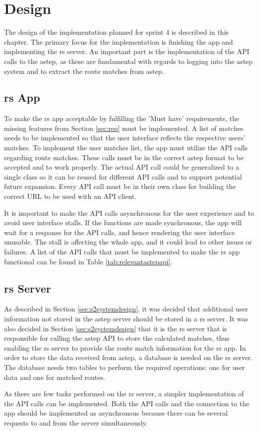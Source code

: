 \section{Design}
The design of the implementation planned for sprint 4 is described in this chapter.
The primary focus for the implementation is finishing the app and implementing the \gls{rs} server.
An important part is the implementation of the API calls to the \gls{astep}, as these are fundamental with regards to logging into the \gls{astep} system and to extract the route matches from \gls{astep}.

\subsection{\gls{rs} App}
To make the \gls{rs} app acceptable by fulfilling the 'Must have' requirements, the missing features from Section \ref{sec:req} must be implemented.
A list of matches needs to be implemented so that the user interface reflects the respective users' matches.
To implement the user matches list, the app must utilize the API calls regarding route matches.
These calls must be in the correct \gls{astep} format to be accepted and to work properly.
The actual API call could be generalized to a single class so it can be reused for different API calls and to support potential future expansion.
Every API call must be in their own class for building the correct URL to be used with an API client.

It is important to make the API calls asynchronous for the user experience and to avoid user interface stalls. 
If the functions are made synchronous, the app will wait for a response for the API calls, and hence rendering the user interface unusable.
The stall is affecting the whole app, and it could lead to other issues or failures.
A list of the API calls that must be implemented to make the \gls{rs} app functional can be found in Table \ref{tab:relevantastepapi}.

\subsection{\gls{rs} Server}
As described in Section \ref{sec:s2systemdesign}, it was decided that additional user information not stored in the \gls{astep} server should be stored in a \gls{rs} server.
It was also decided in Section \ref{sec:s2systemdesign} that it is the \gls{rs} server that is responsible for calling the \gls{astep} API to store the calculated matches, thus enabling the \gls{rs} server to provide the route match information for the \gls{rs} app.
In order to store the data received from \gls{astep}, a database is needed on the \gls{rs} server.
The database needs two tables to perform the required operations: one for user data and one for matched routes.

As there are few tasks performed on the \gls{rs} server, a simpler implementation of the API calls can be implemented.
Both the API calls and the connection to the app should be implemented as asynchronous because there can be several requests to and from the server simultaneously. 